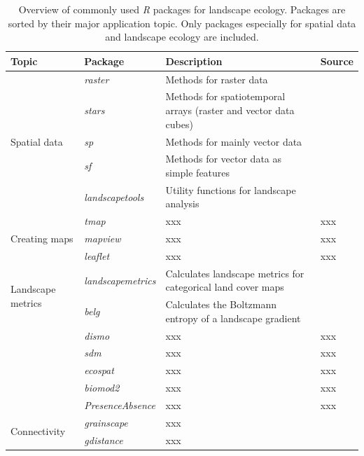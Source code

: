 \documentclass[smallextended]{svjour3}       %
\begin{document}
\begin{landscape}

  \begin{table}
    \begin{tabularx}{0.9\linewidth}{XXXX}
      \caption{Overview of commonly used \textit{R} packages for landscape ecology. Packages are sorted by their major application topic. Only packages especially for spatial data and landscape ecology are included.} \\
      \hline
      Topic & Package & Description & Source \\
      \hline
      \multirow{5}{*}{Spatial data} & \textit{raster} & Methods for raster data & \cite{Hijmans2019} \\
      & \textit{stars} & Methods for spatiotemporal arrays (raster and vector data cubes) & \cite{Pebesma2019} \\
      & \textit{sp} & Methods for mainly vector data & \cite{Pebesma2005,Bivand2013} \\
      & \textit{sf} & Methods for vector data as simple features & \cite{Pebesma2018} \\
      & \textit{landscapetools} & Utility functions for landscape analysis & \cite{Sciaini2018} \\
      \hline
      \multirow{3}{*}{Creating maps} & \textit{tmap} & xxx & xxx \\
      & \textit{mapview} & xxx & xxx \\
      & \textit{leaflet} & xxx & xxx \\
      \hline
      \multirow{2}{*}{Landscape metrics} & \textit{landscapemetrics} & Calculates landscape metrics for categorical land cover maps & \cite{Hesselbarth2019a} \\
      & \textit{belg} & Calculates the Boltzmann entropy of a landscape gradient & \cite{Nowosad2019a} \\
      \hline
      \multirow{5}{*}{}Species distribution modeling (SDM) & \textit{dismo} & xxx & xxx \\
      & \textit{sdm} & xxx & xxx \\
      & \textit{ecospat} & xxx & xxx \\
      & \textit{biomod2} & xxx & xxx \\
      & \textit{PresenceAbsence} & xxx & xxx \\
      \hline
      \multirow{3}{*}{Connectivity} & \textit{grainscape} & xxx & \cite{Chubaty2020} \\
      & \textit{gdistance} & xxx & \cite{vanEtten2017} \\

\end{tabularx}
\end{table}
\end{landscape}
\end{document}
